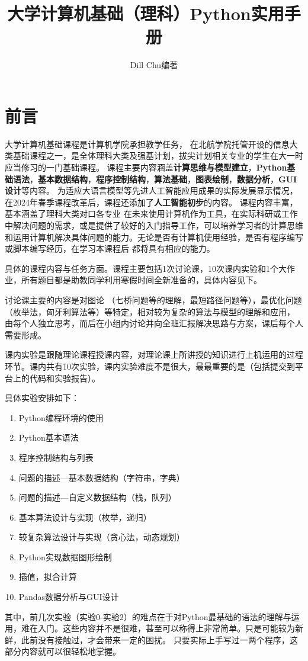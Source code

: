 \documentclass[UTF8,a5paper,10pt]{ctexbook}
\title{大学计算机基础（理科）Python实用手册}
\author{Dill Chu编著}
\begin{document}
\section*{前言}
\setcounter{page}{1}

大学计算机基础课程是计算机学院承担教学任务，
在北航学院托管开设的信息大类基础课程之一，是全体理科大类及强基计划，拔尖计划相关专业的学生在大一时应当修习的一门基础课程。
课程主要内容涵盖\textbf{计算思维与模型建立}，\textbf{Python基础语法}，\textbf{基本数据结构}，\textbf{程序控制结构}，\textbf{算法基础}，\textbf{图表绘制}，\textbf{数据分析}，\textbf{GUI设计}等内容。
为适应大语言模型等先进人工智能应用成果的实际发展显示情况，在2024年春季课程改革后，课程还添加了\textbf{人工智能初步}的内容。
课程内容丰富，基本涵盖了理科大类对口各专业
在未来使用计算机作为工具，在实际科研或工作中解决问题的需求，或是提供了较好的入门指导工作，可以培养学习者的计算思维和运用计算机解决具体问题的能力。无论是否有计算机使用经验，是否有程序编写或脚本编写经历，在学习本课程后
都将具有相应的能力。

具体的课程内容与任务方面。课程主要包括1次讨论课，10次课内实验和1个大作业，所有题目都是助教同学利用寒假时间全新准备的，具体内容见下。

讨论课主要的内容是对图论
（七桥问题等的理解，最短路径问题等），最优化问题（枚举法，匈牙利算法等）等特定，相对较为复杂的算法与模型的理解和应用，
由每个人独立思考，而后在小组内讨论并向全班汇报解决思路与方案，课后每个人需要形成。

课内实验是跟随理论课程授课内容，对理论课上所讲授的知识进行上机运用的过程环节。课内共有10次实验，课内实验难度不是很大，最最重要的是（包括提交到平台上的代码和实验报告）。

具体实验安排如下：
\begin{enumerate}[itemsep=2pt,topsep=0pt,parsep=0pt,start=0]
    \setlength{\itemsep}{-0.1cm}
    \item Python编程环境的使用
    \item Python基本语法
    \item 程序控制结构与列表
    \item 问题的描述—基本数据结构（字符串，字典）
    \item 问题的描述—自定义数据结构（栈，队列）
    \item 基本算法设计与实现（枚举，递归）
    \item 较复杂算法设计与实现（贪心法，动态规划）
    \item Python实现数据图形绘制
    \item 插值，拟合计算
    \item Pandas数据分析与GUI设计
\end{enumerate}
其中，前几次实验（实验0-实验2）的难点在于对Python最基础的语法的理解与运用，难在入门。这些内容并不是很难，甚至可以称得上非常简单。只是可能较为新鲜，此前没有接触过，才会带来一定的困扰。
只要实际上手写过一两个程序，这部分内容就可以很轻松地掌握。
\end{document}
